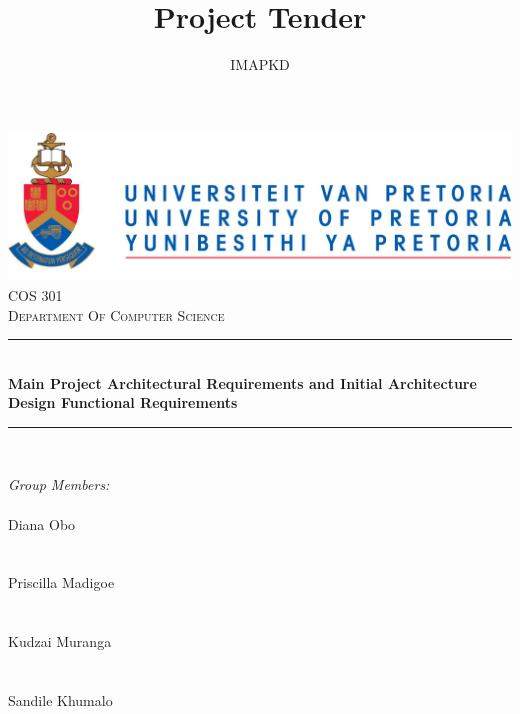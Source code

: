 \documentclass[a4paper,12pt]{article}
\author{IMAPKD}
\title{ Project Tender}
\newcommand{\HRule}{\rule{\linewidth}{0.5mm}}
\begin{document}
\setlength{\parskip}{6pt}

\begin{titlepage}

\begin{center}
\includegraphics[width=1\textwidth]{./University_of_Pretoria_Logo.PNG}\\[0.4cm]  
\textsc{\LARGE COS 301}\\[0.9cm]
\textsc{\LARGE Department Of Computer Science}\\[0.3cm]


\HRule \\[0.4cm]
{ \huge \bfseries Main Project Architectural Requirements and  Initial Architecture Design Functional Requirements}\\[0.1cm]
\HRule \\[0.4cm]  


\begin{minipage}{0.4\textwidth}
\begin{flushleft} \large

\emph{\Large Group Members:}\\[0.4cm]    
\emph{}\\
{\Large Diana {Obo}} \\
\emph{}\\
\emph{}\\
{\Large Priscilla {Madigoe}}\\
\emph{}\\
\emph{}\\
{\Large Kudzai {Muranga}} \\
\emph{}\\
\emph{}\\
{\Large Sandile {Khumalo}}\\
\emph{}\\
\emph{}\\

\end{flushleft}
\end{minipage}
\begin{minipage}{0.4\textwidth}
\begin{flushright} \large


\end{flushright}
\end{minipage}
\end{center}
\end{titlepage}
\end{document}
